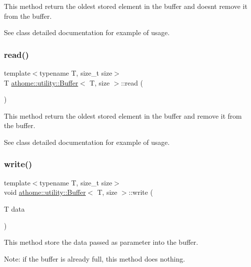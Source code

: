 This method return the oldest stored element in the buffer and doesn\textquotesingle{}t remove it from the buffer.

See class detailed documentation for example of usage. \mbox{\label{classathome_1_1utility_1_1_buffer_afc64f625641e7057b2a12dbf059cbd0c}} 
\subsubsection{\texorpdfstring{read()}{read()}}
{\footnotesize\ttfamily template$<$typename T, size\+\_\+t size$>$ \\
T \mbox{\hyperlink{classathome_1_1utility_1_1_buffer}{athome\+::utility\+::\+Buffer}}$<$ T, size $>$\+::read (\begin{DoxyParamCaption}{ }\end{DoxyParamCaption})\hspace{0.3cm}{\ttfamily [inline]}}

This method return the oldest stored element in the buffer and remove it from the buffer.

See class detailed documentation for example of usage. \mbox{\label{classathome_1_1utility_1_1_buffer_a49f31b68580136d5600491bd11b1e55f}} 
\subsubsection{\texorpdfstring{write()}{write()}}
{\footnotesize\ttfamily template$<$typename T, size\+\_\+t size$>$ \\
void \mbox{\hyperlink{classathome_1_1utility_1_1_buffer}{athome\+::utility\+::\+Buffer}}$<$ T, size $>$\+::write (\begin{DoxyParamCaption}\item[{T}]{data }\end{DoxyParamCaption})\hspace{0.3cm}{\ttfamily [inline]}}

This method store the data passed as parameter into the buffer.

Note\+: if the buffer is already full, this method does nothing.

